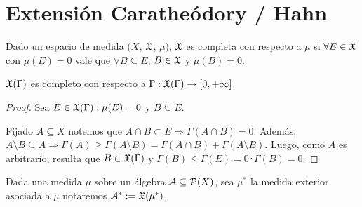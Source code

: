 \section{Extensión Caratheódory / Hahn}

\begin{definition}
    Dado un espacio de medida $(X$, $\mathfrak{X}$, $\mu)$, $\mathfrak{X}$ es completa con respecto a $\mu$ si $\forall E \in \mathfrak{X}$ con $\mu(E) = 0$ vale que
    $\forall B \subseteq E$, $B \in \mathfrak{X}$ y $\mu(B) = 0$.
\end{definition}

\begin{corollary}
    $\mathfrak{X}(\Gamma)$ es completo con respecto a $\Gamma: \mathfrak{X}(\Gamma) \to [0, +\infty]$.
    \begin{proof}
        Sea $E \in \mathfrak{X}(\Gamma) : \mu(E) = 0$ y $B \subseteq E$.

        Fijado $A \subseteq X$ notemos que $A \cap B \subset E \Rightarrow \Gamma(A \cap B) = 0$.
        Además, $A \setminus B \subseteq A \Rightarrow \Gamma(A) \geq \Gamma(A \setminus B) = \Gamma(A \cap B) + \Gamma(A \setminus B)$.
        Luego, como $A$ es arbitrario, resulta que $B \in \mathfrak{X}(\Gamma)$ y $\Gamma(B) \leq \Gamma(E) = 0 \therefore \Gamma(B) = 0$.
    \end{proof}
\end{corollary}

Dada una medida $\mu$ sobre un álgebra $\mathcal{A} \subseteq \mathcal{P}(X)$, sea $\mu^*$ la medida exterior asociada a $\mu$ notaremos $\mathcal{A}^* := \mathfrak{X}(\mu^*)$.

